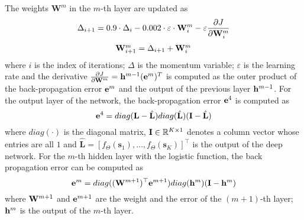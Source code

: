 \documentclass[preprint,12pt,review]{elsarticle}
\begin{document}
%
%
%
%
The weights $\mathbf{W}^m$ in the $m$-th layer are updated as
\begin{equation} \label{eq:weightupdate1}
{\Delta _{i + 1}} = 0.9\cdot{\Delta _i} - 0.002\cdot\varepsilon \cdot{\bf{W}}_i^m - \varepsilon \frac{{\partial J}}{{\partial {\bf{W}}_i^m}}
\end{equation}
\begin{equation} \label{eq:weightupdate2}
\begin{array}{l}
{\bf{W}}_{i + 1}^m = {\Delta _{i + 1}} + {\bf{W}}_i^m\\
\end{array}
\end{equation}
where $i$ is the index of iterations; $\Delta $ is the momentum variable; $\varepsilon$ is the learning rate and the derivative $\frac{{\partial J}}{{\partial {{\bf{W}}^m}}} = {{\bf{h}}^{m - 1}}{({{\bf{e}}^m})^T} $  is computed as the outer product of the back-propagation error ${{\bf{e}}^m}$ and the output of the previous layer ${{\bf{h}}^{m - 1}}$.
%
For the output layer of the network, the back-propagation error ${{\bf{e}}^4}$ is computed as
\begin{equation}{{\bf{e}}^4} = diag({\bf{L}}  - {\hat{\bf{L}}})diag(\hat{\bf{L}})({\bf{I}} - \hat{\bf{L}})\mathbb{}
\end{equation}
where $diag( \cdot )$ is the diagonal matrix, ${\bf{I}} \in \mathbb{R}^{K\times 1}$
denotes a column vector whose entries are all $1$ and $\hat{\mathbf{L}} = [f_{\Theta}(\mathbf{s}_1),\ldots,f_{\Theta}(\mathbf{s}_K)]^{\top}$ is the output of the deep network.
%
For the $m$-th hidden layer with the logistic function, the back propagation error can be computed as
\begin{equation}{{\bf{e}}^m} = diag({({\bf{W}}^{m +1})^{\top}}{{\bf{e}}^{m + 1}})diag({{\bf{h}}^m})({\bf{I}} - {{\bf{h}}^m})
\end{equation}
where ${{\bf{W}}^{m + 1}}$ and ${{\bf{e}}^{m + 1}}$ are the weight and the error of the $(m+1)$-th layer; ${{\bf{h}}^m}$ is the output of the $m$-th layer.
%
\end{document}
